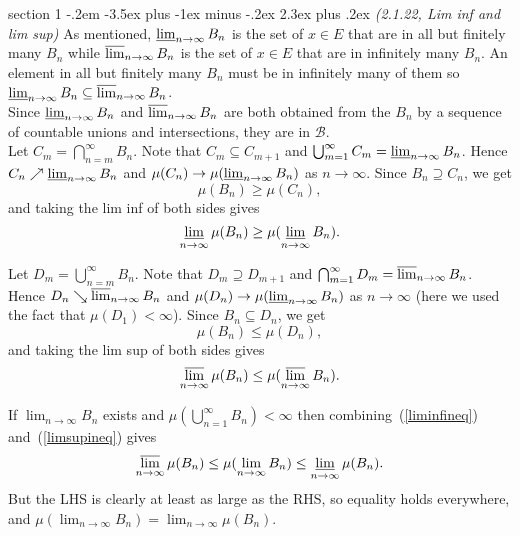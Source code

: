 \documentclass[12pt]{article}
\makeatletter
\theoremstyle{norm}
\providecommand{\cal}[1]{\mathcal{#1}}
\renewcommand{\cal}[1]{\mathcal{#1}}
\newcommand{\subeq}[0]{\subseteq}
\newcommand{\supeq}[0]{\supseteq}
\newcommand{\pa}[1]{\left( {#1} \right)}
\newenvironment{problem}{\@startsection
       {section}
       {1}
       {-.2em}
       {-3.5ex plus -1ex minus -.2ex}
       {2.3ex plus .2ex}
       {\pagebreak[3]%
       \large\bf\noindent{Problem }
       }
       }
       {%
       }
\makeatother
\begin{document}
\begin{problem} {\it (2.1.22, Lim inf and lim sup)}
As mentioned, $\varliminf_{n\to \infty} B_n$ is the set of $x\in E$ that are in all but finitely many $B_n$ while $\varlimsup_{n\to \infty} B_n$ is the set of $x\in E$ that are in infinitely many $B_n$. An element in all but finitely many $B_n$ must be in infinitely many of them so $\varliminf_{n\to \infty} B_n\subeq \varlimsup_{n\to \infty}B_n$.\\

Since $\varliminf_{n\to \infty} B_n$ and $\varlimsup_{n\to \infty}B_n$ are both obtained from the $B_n$ by a sequence of countable unions and intersections, they are in $\cal B$.\\

Let $C_m=\bigcap_{n=m}^{\infty} B_n$. Note that $C_{m}\subeq C_{m+1}$ and $\bigcup_{m=1}^{\infty} C_m=\varliminf_{n\to \infty} B_n$. Hence $C_n\nearrow \varliminf_{n\to \infty} B_n$ and $\mu(C_n)\to \mu(\varliminf_{n\to \infty} B_n)$ as $n\to \infty$. Since $B_n\supeq C_n$, we get
\[
\mu(B_n)\geq \mu(C_n),
\]
and taking the lim inf of both sides gives
\begin{equation}\label{liminfineq}
\varliminf_{n\to \infty}\mu(B_n)\geq \mu(\varliminf_{n\to \infty} B_n).
\end{equation}

Let $D_m=\bigcup_{n=m}^{\infty} B_n$. Note that $D_{m}\supeq D_{m+1}$ and $\bigcap_{m=1}^{\infty} D_m=\varlimsup_{n\to \infty} B_n$. Hence $D_n\searrow \varlimsup_{n\to \infty} B_n$ and $\mu(D_n)\to \mu(\varliminf_{n\to \infty} B_n)$ as $n\to \infty$ (here we used the fact that $\mu(D_1)<\infty$). Since $B_n\subeq D_n$, we get
\[
\mu(B_n)\leq \mu(D_n),
\]
and taking the lim sup of both sides gives
\begin{equation}\label{limsupineq}
\varlimsup_{n\to \infty}\mu(B_n)\leq \mu(\varlimsup_{n\to \infty} B_n).
\end{equation}

If $\lim_{n\to \infty}B_n$ exists and $\mu\pa{\bigcup_{n=1}^{\infty} B_n}<\infty$ then combining~(\ref{liminfineq}) and~(\ref{limsupineq}) gives
\[
\varlimsup_{n\to \infty}\mu(B_n)\leq \mu(\lim_{n\to \infty} B_n)\leq \varliminf_{n\to \infty} \mu(B_n).
\]
But the LHS is clearly at least as large as the RHS, so equality holds everywhere, and $\mu(\lim_{n\to \infty} B_n)=\lim_{n\to \infty}\mu(B_n)$.
\end{problem}
\end{document}
